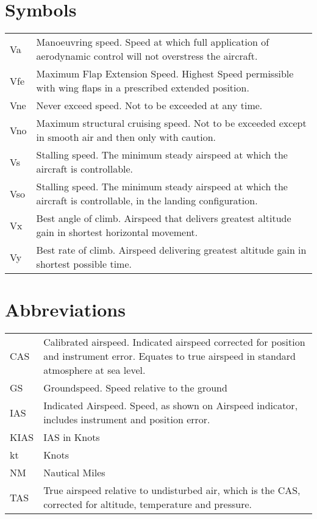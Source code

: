 \section{Symbols}
  \begin{tabularx}{\linewidth}{
    >{\hsize=0.2\hsize}X
    >{\hsize=0.8\hsize}X  }
Va & Manoeuvring speed. Speed at which full application of aerodynamic control will not overstress the aircraft. \\
Vfe & Maximum Flap Extension Speed. Highest Speed permissible with wing flaps in a prescribed extended position. \\
Vne & Never exceed speed. Not to be exceeded at any time. \\
Vno & Maximum structural cruising speed. Not to be exceeded except in smooth air and then only with caution.\\ 
Vs & Stalling speed. The minimum steady airspeed at which the aircraft is controllable. \\
Vso & Stalling speed. The minimum steady airspeed at which the aircraft is controllable, in the landing configuration. \\
Vx & Best angle of climb. Airspeed that delivers greatest altitude gain in shortest horizontal movement. \\
Vy & Best rate of climb. Airspeed delivering greatest altitude gain in shortest possible time.\\
\end{tabularx}

\section{Abbreviations}
  \begin{tabularx}{\linewidth}{
    >{\hsize=0.2\hsize}X
    >{\hsize=0.8\hsize}X  }
CAS & Calibrated airspeed. Indicated airspeed corrected for position and instrument error. Equates to true airspeed in standard atmosphere at sea level. \\
GS & Groundspeed. Speed relative to the ground \\
IAS & Indicated Airspeed. Speed, as shown on Airspeed indicator, includes instrument and position error. \\
KIAS & IAS in Knots \\
kt & Knots \\
NM & Nautical Miles\\
TAS & True airspeed relative to undisturbed air, which is the CAS, corrected for altitude, temperature and pressure. \\
\end{tabularx}

